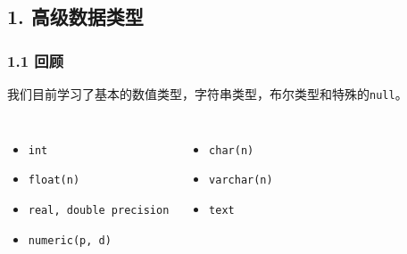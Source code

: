 \documentclass[aspectratio=169, 14pt]{beamer}
\begin{document}
{
    \begin{frame}
        \section{\textcolor{darkmidnightblue}{1. 高级数据类型}}
    \end{frame}
}

\begin{frame}
    \frametitle{1.1 回顾}
我们目前学习了基本的数值类型，字符串类型，布尔类型和特殊的\texttt{null}。

\begin{columns}
    \begin{itemize}
        \item \texttt{int}
        \item \texttt{float(n)}
        \item \texttt{real, double precision}
        \item \texttt{numeric(p, d)}
    \end{itemize}
    \begin{itemize}
        \item \texttt{char(n)}
        \item \texttt{varchar(n)}
        \item \texttt{text}
    \end{itemize}
\end{columns}

\end{frame}
\end{document}
